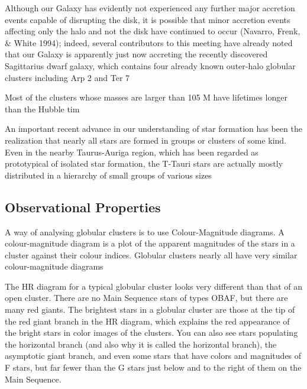  Although our Galaxy has evidently not experienced any further major accretion events capable of disrupting the disk, it is possible that minor accretion events affecting only the halo and not the disk have continued to occur (Navarro, Frenk, \& White 1994); indeed, several contributors to this meeting have already noted that our Galaxy is apparently just now accreting the recently discovered Sagittarius dwarf galaxy, which contains four already known outer-halo globular clusters including Arp 2 and Ter 7 

Most of the clusters
whose masses are larger than 105 M have lifetimes longer than the Hubble tim

An important recent advance in our understanding of star formation has
been the realization that nearly all stars are formed in groups or clusters of
some kind. Even in the nearby Taurus-Auriga region, which has been regarded
as prototypical of isolated star formation, the T-Tauri stars are actually mostly
distributed in a hierarchy of small groups of various sizes




\subsection{Observational Properties}

A way of analysing globular clusters is to use Colour-Magnitude diagrams. A colour-magnitude diagram is a plot of the apparent magnitudes of the stars in a cluster against their colour indices. Globular clusters nearly all have very similar colour-magnitude diagrams

The HR diagram for a typical globular cluster looks very different than that of an open cluster. There are no Main Sequence stars of types OBAF, but there are many red giants. The brightest stars in a globular cluster are those at the tip of the red giant branch in the HR diagram, which explains the red appearance of the bright stars in color images of the clusters. You can also see stars populating the horizontal branch (and also why it is called the horizontal branch), the asymptotic giant branch, and even some stars that have colors and magnitudes of F stars, but far fewer than the G stars just below and to the right of them on the Main Sequence.

